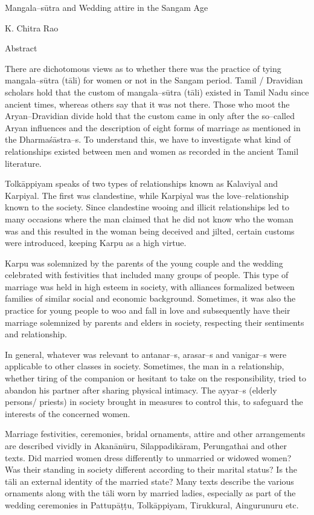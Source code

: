 
Mangala–sūtra and Wedding attire in the Sangam Age\label{chap02}

K. Chitra Rao

Abstract

There are dichotomous views as to whether there was the practice of tying mangala–sūtra (tāli) for women or not in the Sangam period. Tamil / Dravidian scholars hold that the custom of mangala–sūtra (tāli) existed in Tamil Nadu since ancient times, whereas others say that it was not there. Those who moot the Aryan–Dravidian divide hold that the custom came in only after the so–called Aryan influences and the description of eight forms of marriage as mentioned in the Dharmaśāstra–s. To understand this, we have to investigate what kind of relationships existed between men and women as recorded in the ancient Tamil literature. 

Tolkāppiyam speaks of two types of relationships known as Kalaviyal and Karpiyal. The first was clandestine, while Karpiyal was the love–relationship known to the society. Since clandestine wooing and illicit relationships led to many occasions where the man claimed that he did not know who the woman was and this resulted in the woman being deceived and jilted, certain customs were introduced, keeping Karpu as a high virtue. 

Karpu was solemnized by the parents of the young couple and the wedding celebrated with festivities that included many groups of people. This type of marriage was held in high esteem in society, with alliances formalized between families of similar social and economic background. Sometimes, it was also the practice for young people to woo and fall in love and subsequently have their marriage solemnized by parents and elders in society, respecting their sentiments and relationship.

In general, whatever was relevant to antanar–s, arasar–s and vanigar–s were applicable to other classes in society. Sometimes, the man in a relationship, whether tiring of the companion or hesitant to take on the responsibility, tried to abandon his partner after sharing physical intimacy. The ayyar–s (elderly persons/ priests) in society brought in measures to control this, to safeguard the interests of the concerned women. 

Marriage festivities, ceremonies, bridal ornaments, attire and other arrangements are described vividly in Akanānūru, Silappadikāram, Perungathai and other texts. Did married women dress differently to unmarried or widowed women? Was their standing in society different according to their marital status? Is the tāli an external identity of the married state? Many texts describe the various ornaments along with the tāli worn by married ladies, especially as part of the wedding ceremonies in Pattupāṭṭu, Tolkāppiyam, Tirukkural, Aingurunuru etc.

